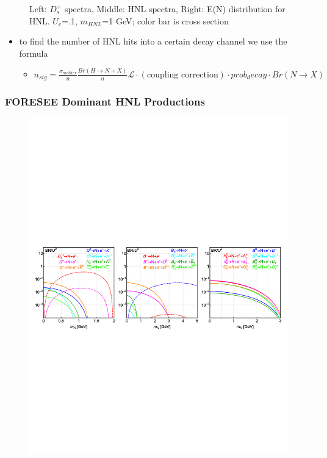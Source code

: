 \documentclass[
	11pt, %
]{beamer}
\begin{document}
\begin{frame}
\begin{figure}
	\vspace*{-1cm}
	 \hspace*{-0cm}
	\caption{Left: $D_s^+$ spectra, Middle: HNL spectra, Right: E(N) distribution for HNL. $U_e$=.1, $m_{HNL}$=1 GeV; color bar is cross section}
	\centering
\end{figure}
\end{frame}

\begin{frame}
\begin{itemize}
\item to find the number of HNL hits into a certain decay channel we use the formula
\begin{itemize}
\item $n_{sig} = \frac{\sigma_{mother}}{n} \frac{Br(H \rightarrow N + X)}{n} \mathcal{L} \cdot (\text{coupling correction}) \cdot prob_decay \cdot Br(N \rightarrow X)$
\end{itemize}
\end{itemize}
\frametitle{FORESEE Dominant HNL Productions}
\begin{figure}
	\vspace*{-1cm}
	 \hspace*{-0cm}
	\includegraphics[scale=.4]{Br_dom.pdf}
	\vspace*{-1cm}
	 \hspace*{-0cm}
	\caption{}
	\centering
\end{figure}

\end{frame}
\end{document}
